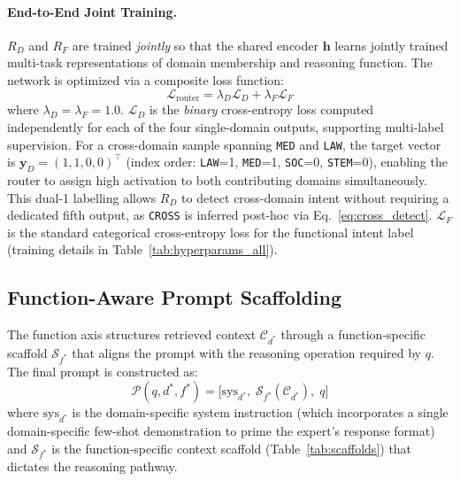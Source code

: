 \documentclass[a4paper,fleql]{cas-sc}
\begin{document}
\paragraph{End-to-End Joint Training.}
$R_D$ and $R_F$ are trained \emph{jointly} so that the shared encoder
$\mathbf{h}$ learns jointly trained multi-task representations of domain membership and
reasoning function. The network is optimized via a composite loss function:
\begin{equation}
    \mathcal{L}_{\text{router}} = \lambda_D \mathcal{L}_{D}
    + \lambda_F \mathcal{L}_{F}
    \label{eq:joint_loss}
\end{equation}
where $\lambda_D = \lambda_F = 1.0$.
$\mathcal{L}_{D}$ is the \emph{binary} cross-entropy loss computed
independently for each of the four single-domain outputs, supporting
multi-label supervision. For a cross-domain sample spanning
\texttt{MED} and \texttt{LAW}, the target vector is
$\mathbf{y}_D = (1, 1, 0, 0)^\top$
(index order: \texttt{LAW}=1, \texttt{MED}=1, \texttt{SOC}=0,
\texttt{STEM}=0), enabling the router to assign high activation to both
contributing domains simultaneously. This dual-1 labelling allows
$R_D$ to detect cross-domain intent without requiring a dedicated
fifth output, as \texttt{CROSS} is inferred post-hoc via
Eq.~\ref{eq:cross_detect}.
$\mathcal{L}_{F}$ is the standard categorical cross-entropy loss for the functional intent label (training details in Table~\ref{tab:hyperparams_all}).

\subsection{Function-Aware Prompt Scaffolding}
\label{ssec:functionaxis}
The function axis structures retrieved context $\mathcal{C}_{d^*}$ through
a function-specific scaffold $\mathcal{S}_{f^*}$ that aligns the prompt with
the reasoning operation required by $q$. The final prompt is constructed as:
\begin{equation}
    \mathcal{P}(q, d^*, f^*) = \big[ \text{sys}_{d^*},\;
    \mathcal{S}_{f^*}(\mathcal{C}_{d^*}),\; q \big]
    \label{eq:prompt}
\end{equation}
where $\text{sys}_{d^*}$ is the domain-specific system instruction
(which incorporates a single domain-specific few-shot demonstration to
prime the expert's response format) and $\mathcal{S}_{f^*}$ is the
function-specific context scaffold (Table~\ref{tab:scaffolds}) that
dictates the reasoning pathway.
\end{document}
